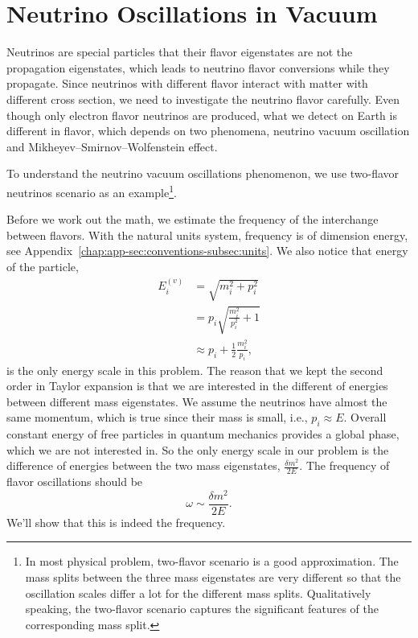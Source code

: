 \section{\label{chap:basics-sec:vacuum-osc}Neutrino Oscillations in Vacuum}

Neutrinos are special particles that their flavor eigenstates are not the propagation eigenstates, which leads to neutrino flavor conversions while they propagate. Since neutrinos with different flavor interact with matter with different cross section, we need to investigate the neutrino flavor carefully. Even though only electron flavor neutrinos are produced, what we detect on Earth is different in flavor, which depends on two phenomena, neutrino vacuum oscillation and Mikheyev–Smirnov–Wolfenstein effect.


To understand the neutrino vacuum oscillations phenomenon, we use two-flavor neutrinos scenario as an example\footnote{In most physical problem, two-flavor scenario is a good approximation. The mass splits between the three mass eigenstates are very different so that the oscillation scales differ a lot for the different mass splits. Qualitatively speaking, the two-flavor scenario captures the significant features of the corresponding mass split.}.

Before we work out the math, we estimate the frequency of the interchange between flavors. With the natural units system, frequency is of dimension energy, see Appendix~\ref{chap:app-sec:conventions-subsec:units}. We also notice that energy of the particle,
\begin{align}
E_i^{(v)} & = \sqrt{m_i^2 + p_i^2 } \\
& = p_i \sqrt{\frac{m_i^2}{p_i^2} + 1} \\
& \approx p_i + \frac{1}{2} \frac{m_i^2}{p_i},
\label{chap:basics-section:neutrinos-eqn:energy-taylor}
\end{align}
is the only energy scale in this problem. The reason that we kept the second order in Taylor expansion is that we are interested in the different of energies between different mass eigenstates. We assume the neutrinos have almost the same momentum, which is true since their mass is small, i.e., $p_i \approx E$. Overall constant energy of free particles in quantum mechanics provides a global phase, which we are not interested in. So the only energy scale in our problem is the difference of energies between the two mass eigenstates, $\frac{\delta m^2}{2E}$. The frequency of flavor oscillations should be
\begin{equation}
    \omega \sim \frac{\delta m^2}{2E}.
    \label{chap:basics-section:neutrinos-eqn:qualitative-method-frequency}
\end{equation}
We'll show that this is indeed the frequency.

